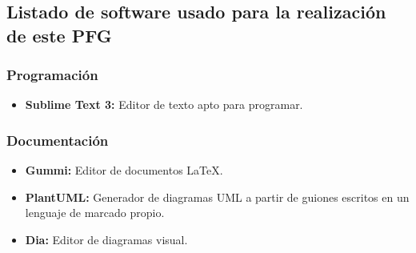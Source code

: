 \documentclass[spanish,12pt, a4paper, twoside]{paper}
\begin{document}
\subsection*{Listado de software usado para la realización de este PFG}

\subsubsection*{Programación}

\begin{itemize}
\item\textbf{Sublime Text 3:} Editor de texto apto para programar.
\end{itemize}

\subsubsection*{Documentación}

\begin{itemize}
\item\textbf{Gummi:} Editor de documentos \LaTeX.
\item\textbf{PlantUML:} Generador de diagramas UML a partir de guiones escritos en un lenguaje de marcado propio.
\item\textbf{Dia:} Editor de diagramas visual.
\end{itemize}

\newpage
\end{document}
